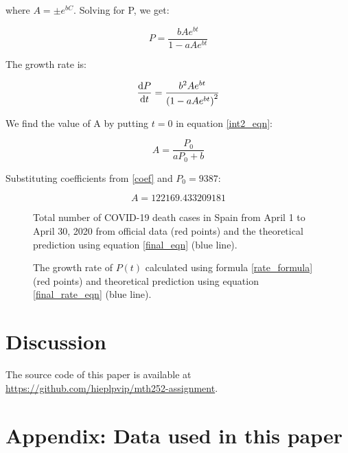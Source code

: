 \documentclass[12pt]{scrartcl}
\begin{document}
where $A = \pm e^{bC}$. Solving for P, we get:

\begin{equation} \label{final_eqn}
P = \frac{bAe^{bt}}{1 - aAe^{bt}}
\end{equation}

The growth rate is:

\begin{equation} \label{final_rate_eqn}
\diff{P}{t} = \frac{b^2Ae^{bt}}{\left ( 1 - aAe^{bt} \right ) ^2}
\end{equation}

We find the value of A by putting $t = 0$ in equation \ref{int2_eqn}:

\begin{equation*}
A = \frac{P_0}{aP_0 + b}
\end{equation*}

Substituting coefficients from \ref{coef} and $P_0 = 9387$:

\begin{equation*}
A = 122169.433209181
\end{equation*}

\begin{figure}[H]
  \begin{center}
    
  \end{center}
  \caption{Total number of COVID-19 death cases in Spain from April 1 to
  April 30, 2020 from official data (red points) and the
  theoretical prediction using equation \ref{final_eqn} (blue line).}
\end{figure}

\begin{figure}[H]
  \begin{center}
    
  \end{center}
  \caption{The growth rate of $P(t)$ calculated using formula \ref{rate_formula} (red points)
  and theoretical prediction using equation \ref{final_rate_eqn} (blue line).}
\end{figure}

\section*{Discussion}

The source code of this paper is available at
\url{https://github.com/hieplpvip/mth252-assignment}.

\printbibliography

\newpage

\appendix
\section*{Appendix: Data used in this paper}


\end{document}
